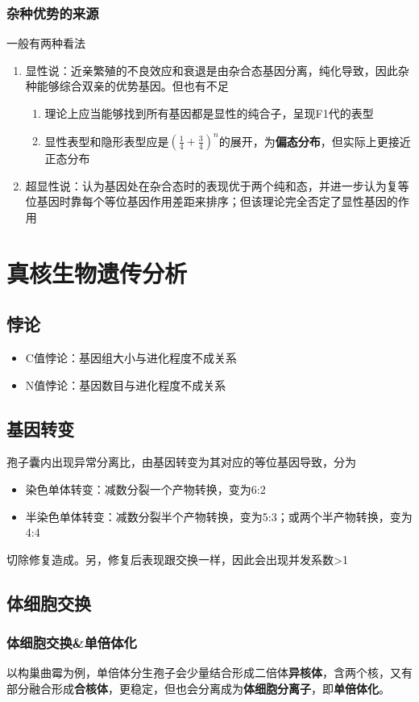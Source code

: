 \documentclass[a4paper, 12pt]{report}
\begin{document}
\subsection{杂种优势的来源}
一般有两种看法
\begin{enumerate}
    \item 显性说：近亲繁殖的不良效应和衰退是由杂合态基因分离，纯化导致，因此杂种能够综合双亲的优势基因。但也有不足
          \begin{enumerate}
              \item 理论上应当能够找到所有基因都是显性的纯合子，呈现F1代的表型
              \item 显性表型和隐形表型应是\((\frac{1}{4}+\frac{3}{4})^n\)的展开，为\textbf{偏态分布}，但实际上更接近正态分布
          \end{enumerate}
    \item 超显性说：认为基因处在杂合态时的表现优于两个纯和态，并进一步认为复等位基因时靠每个等位基因作用差距来排序；但该理论完全否定了显性基因的作用
\end{enumerate}
\chapter{真核生物遗传分析}
\section{悖论}
\begin{itemize}
    \item C值悖论：基因组大小与进化程度不成关系
    \item N值悖论：基因数目与进化程度不成关系
\end{itemize}
\section{基因转变}
孢子囊内出现异常分离比，由基因转变为其对应的等位基因导致，分为
\begin{itemize}
    \item 染色单体转变：减数分裂一个产物转换，变为6:2
    \item 半染色单体转变：减数分裂半个产物转换，变为5:3；或两个半产物转换，变为4:4
\end{itemize}
切除修复造成。另，修复后表现跟交换一样，因此会出现并发系数>1
\section{体细胞交换}
\subsection{体细胞交换\&单倍体化}
以构巢曲霉为例，单倍体分生孢子会少量结合形成二倍体\textbf{异核体}，含两个核，又有部分融合形成\textbf{合核体}，更稳定，但也会分离成为\textbf{体细胞分离子}，即\textbf{单倍体化}。
\end{document}
